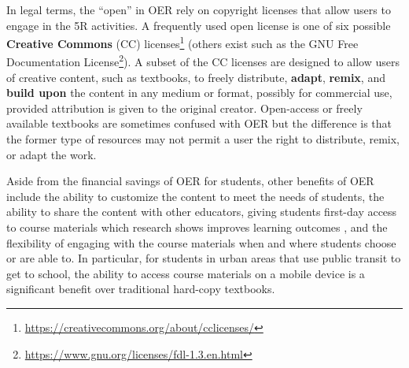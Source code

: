 \documentclass[11pt]{article}
\begin{document}
In legal terms, the ``open'' in OER rely on copyright licenses that allow users to engage in the 5R activities.  A frequently used open license is one of six possible \textbf{Creative Commons} (CC) licenses\footnote{\href{https://creativecommons.org/about/cclicenses/}{https://creativecommons.org/about/cclicenses/}} (others exist such as the GNU Free Documentation License\footnote{\href{https://www.gnu.org/licenses/fdl-1.3.en.html}{https://www.gnu.org/licenses/fdl-1.3.en.html}}).  A subset of the CC licenses are designed to allow users of creative content, such as textbooks, to freely distribute, \textbf{adapt}, \textbf{remix}, and \textbf{build upon} the content in any medium or format, possibly for commercial use, provided attribution is given to the original creator.  Open-access or freely available textbooks are sometimes confused with OER but the difference is that the former type of resources may not permit a user the right to distribute, remix, or adapt the work.

Aside from the financial savings of OER for students, other benefits of OER include the ability to customize the content to meet the needs of students, the ability to share the content with other educators, giving students first-day access to course materials which research shows improves learning outcomes \cite{LA:2017}, and the flexibility of engaging with the course materials when and where students choose or are able to.  In particular, for students in urban areas that use public transit to get to school, the ability to access course materials on a mobile device is a significant benefit \cite{CC:17, MS:14} over traditional hard-copy textbooks.
\end{document}
